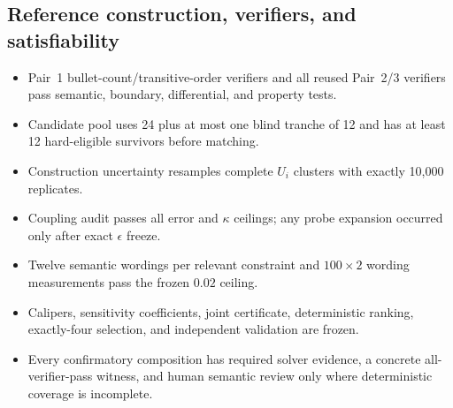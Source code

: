 \documentclass[11pt,a4paper]{article}
\begin{document}
\subsection{Reference construction, verifiers, and satisfiability}
\begin{itemize}
\item[$\square$] Pair~1 bullet-count/transitive-order verifiers and all reused Pair~2/3 verifiers pass semantic, boundary, differential, and property tests.
\item[$\square$] Candidate pool uses 24 plus at most one blind tranche of 12 and has at least 12 hard-eligible survivors before matching.
\item[$\square$] Construction uncertainty resamples complete $U_i$ clusters with exactly 10,000 replicates.
\item[$\square$] Coupling audit passes all error and $\kappa$ ceilings; any probe expansion occurred only after exact $\epsilon$ freeze.
\item[$\square$] Twelve semantic wordings per relevant constraint and $100\times2$ wording measurements pass the frozen $0.02$ ceiling.
\item[$\square$] Calipers, sensitivity coefficients, joint certificate, deterministic ranking, exactly-four selection, and independent validation are frozen.
\item[$\square$] Every confirmatory composition has required solver evidence, a concrete all-verifier-pass witness, and human semantic review only where deterministic coverage is incomplete.
\end{itemize}
\end{document}
